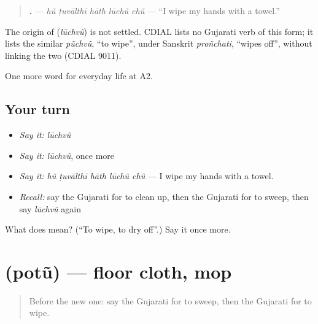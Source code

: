 \begin{quote}
\textbf{    .} — \emph{hũ ṭuvālthī hāth lūchũ chũ} — \textquotedblleft{}I wipe my hands with a towel.\textquotedblright{}
\end{quote}

\begin{cousinweb}
The origin of \textbf{} (\emph{lūchvũ}) is not settled. CDIAL lists no Gujarati verb of this form; it lists the similar \emph{pũchvũ}, \textquotedblleft{}to wipe\textquotedblright{}, under Sanskrit \emph{proñchati}, \textquotedblleft{}wipes off\textquotedblright{}, without linking the two (CDIAL 9011).
\end{cousinweb}

\begin{grammarlens}[title={What you've built}]
One more word for everyday life at A2.
\end{grammarlens}

\subsection*{Your turn}
\begin{itemize}
\raggedright
  \item \emph{Say it:} \emph{lūchvũ}
  \item \emph{Say it:} \emph{lūchvũ}, once more
  \item \emph{Say it:} \emph{hũ ṭuvālthī hāth lūchũ chũ} — I wipe my hands with a towel.
  \item \emph{Recall:} say the Gujarati for to clean up, then the Gujarati for to sweep, then say \emph{lūchvũ} again
\end{itemize}

\begin{tcolorbox}[breakable,colback=teal!4,colframe=teal!35!black,title={Before you move on}]
What does  mean? (\textquotedblleft{}To wipe, to dry off\textquotedblright{}.) Say it once more.
\end{tcolorbox}
\section[\texorpdfstring{\gu{પોતું} (potũ)}{પોતું (potũ)}]{ (potũ) — floor cloth, mop}

\label{lesson:GU-C158-potu}



\begin{quote}
Before the new one: say the Gujarati for to sweep, then the Gujarati for to wipe.
\end{quote}

